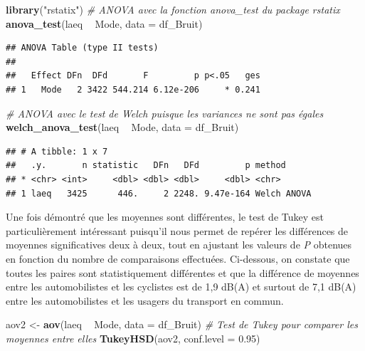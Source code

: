 \documentclass[
  11pt,
  french,
]{book}
\makeatletter
\newenvironment{Shaded}{\begin{snugshade}}{\end{snugshade}}
\newcommand{\CommentTok}[1]{\textcolor[rgb]{0.56,0.35,0.01}{\textit{#1}}}
\newcommand{\DataTypeTok}[1]{\textcolor[rgb]{0.13,0.29,0.53}{#1}}
\newcommand{\FloatTok}[1]{\textcolor[rgb]{0.00,0.00,0.81}{#1}}
\newcommand{\KeywordTok}[1]{\textcolor[rgb]{0.13,0.29,0.53}{\textbf{#1}}}
\newcommand{\NormalTok}[1]{#1}
\newcommand{\OperatorTok}[1]{\textcolor[rgb]{0.81,0.36,0.00}{\textbf{#1}}}
\newcommand{\StringTok}[1]{\textcolor[rgb]{0.31,0.60,0.02}{#1}}
\newenvironment{kframe}{%
\medskip{}
\setlength{\fboxsep}{.8em}
 \def\at@end@of@kframe{}%
 \ifinner\ifhmode%
  \def\at@end@of@kframe{\end{minipage}}%
  \begin{minipage}{\columnwidth}%
 \fi\fi%
 \def\FrameCommand##1{\hskip\@totalleftmargin \hskip-\fboxsep
 \colorbox{shadecolor}{##1}\hskip-\fboxsep
     \hskip-\linewidth \hskip-\@totalleftmargin \hskip\columnwidth}%
 \MakeFramed {\advance\hsize-\width
   \@totalleftmargin\z@ \linewidth\hsize
   \@setminipage}}%
 {\par\unskip\endMakeFramed%
 \at@end@of@kframe}
\renewenvironment{Shaded}{\begin{kframe}}{\end{kframe}}
\makeatother
\begin{document}
\begin{Shaded}
\begin{Highlighting}[]
\KeywordTok{library}\NormalTok{(}\StringTok{"rstatix"}\NormalTok{)}
\CommentTok{# ANOVA avec la fonction anova_test du package rstatix}
\KeywordTok{anova_test}\NormalTok{(laeq }\OperatorTok{~}\StringTok{ }\NormalTok{Mode, }\DataTypeTok{data =}\NormalTok{ df_Bruit)}
\end{Highlighting}
\end{Shaded}

\begin{verbatim}
## ANOVA Table (type II tests)
## 
##   Effect DFn  DFd       F         p p<.05   ges
## 1   Mode   2 3422 544.214 6.12e-206     * 0.241
\end{verbatim}

\begin{Shaded}
\begin{Highlighting}[]
\CommentTok{# ANOVA avec le test de Welch puisque les variances ne sont pas égales}
\KeywordTok{welch_anova_test}\NormalTok{(laeq }\OperatorTok{~}\StringTok{ }\NormalTok{Mode, }\DataTypeTok{data =}\NormalTok{ df_Bruit)}
\end{Highlighting}
\end{Shaded}

\begin{verbatim}
## # A tibble: 1 x 7
##   .y.       n statistic   DFn   DFd         p method     
## * <chr> <int>     <dbl> <dbl> <dbl>     <dbl> <chr>      
## 1 laeq   3425      446.     2 2248. 9.47e-164 Welch ANOVA
\end{verbatim}

Une fois démontré que les moyennes sont différentes, le test de Tukey est particulièrement intéressant puisqu'il nous permet de repérer les différences de moyennes significatives deux à deux, tout en ajustant les valeurs de \emph{P} obtenues en fonction du nombre de comparaisons effectuées. Ci-dessous, on constate que toutes les paires sont statistiquement différentes et que la différence de moyennes entre les automobilistes et les cyclistes est de 1,9 dB(A) et surtout de 7,1 dB(A) entre les automobilistes et les usagers du transport en commun.

\begin{Shaded}
\begin{Highlighting}[]
\NormalTok{aov2 <-}\StringTok{ }\KeywordTok{aov}\NormalTok{(laeq }\OperatorTok{~}\StringTok{ }\NormalTok{Mode, }\DataTypeTok{data =}\NormalTok{ df_Bruit)}
\CommentTok{# Test de Tukey pour comparer les moyennes entre elles}
\KeywordTok{TukeyHSD}\NormalTok{(aov2, }\DataTypeTok{conf.level =} \FloatTok{0.95}\NormalTok{)}
\end{Highlighting}
\end{Shaded}
\end{document}
